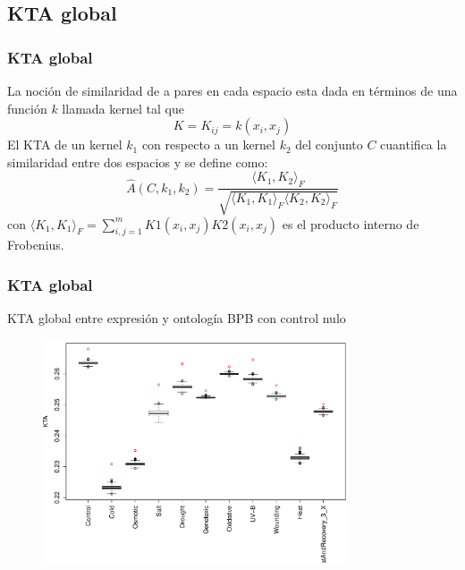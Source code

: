 \documentclass[serif,9pt, t]{beamer}
\begin{document}
\subsection{KTA global}
\begin{frame}\frametitle{KTA global} 
La noción de similaridad de a pares en cada espacio esta dada en términos de una función $k$ llamada kernel tal que
\begin{equation}
	K = K_{ij} = k(x_i, x_j)
\end{equation}
\bigskip
El KTA de un kernel $k_1$ con respecto a un kernel $k_2$ del conjunto $C$ cuantifica la similaridad entre dos espacios y se define como:
\begin{equation}
	\hat{A}(C, k_1, k_2) = \frac{\langle K_1, K_2 \rangle _F}{\sqrt{\langle K_1, K_1 \rangle _F \langle K_2, K_2 \rangle _F}}
\end{equation}
con $\langle K_1, K_1 \rangle _F = \sum_{i,j=1}^m K1(x_i, x_j)K2(x_i, x_j)$ es el producto interno de Frobenius.\\
\end{frame}

\begin{frame}\frametitle{KTA global} 
\centering
KTA global entre expresión y ontología BPB con control nulo
\begin{figure}
    	\centering
	\includegraphics[width=0.8\textwidth]{kta_global_bpb.pdf}
\end{figure}
\centering
\end{frame}
\end{document}
